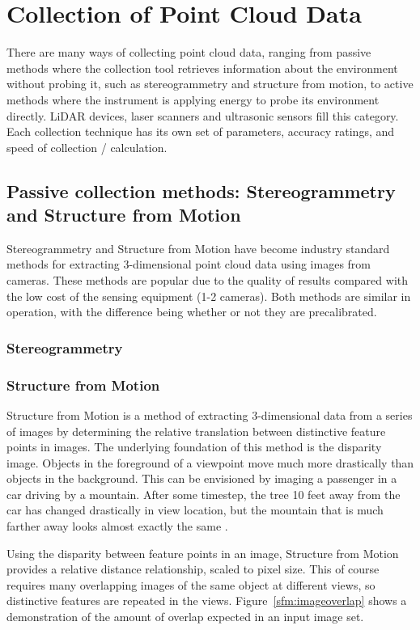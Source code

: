 \documentclass[12pt]{drexelthesis}
\let\Oldsection\section
\renewcommand{\section}{\FloatBarrier\Oldsection}
\let\Oldsubsection\subsection
\renewcommand{\subsection}{\FloatBarrier\Oldsubsection}
\let\Oldsubsubsection\subsubsection
\renewcommand{\subsubsection}{\FloatBarrier\Oldsubsubsection}
\begin{document}
\section{Collection of Point Cloud Data}
\label{sec:PCcollection}
There are many ways of collecting point cloud data, ranging from passive methods where the collection tool retrieves information about the environment without probing it, such as stereogrammetry and structure from motion, to active methods where the instrument is applying energy to probe its environment directly. LiDAR devices, laser scanners and ultrasonic sensors fill this category. Each collection technique has its own set of parameters, accuracy ratings, and speed of collection / calculation.

\subsection{Passive collection methods: Stereogrammetry and Structure from Motion}
\label{subsec:passive}
Stereogrammetry and Structure from Motion have become industry standard methods for extracting 3-dimensional point cloud data using images from cameras. These methods are popular due to the quality of results compared with the low cost of the sensing equipment (1-2 cameras). Both methods are similar in operation, with the difference being whether or not they are precalibrated.


\subsubsection{Stereogrammetry}
\subsubsection{Structure from Motion}

Structure from Motion is a method of extracting 3-dimensional data from a series of images by determining the relative translation between distinctive feature points in images. The underlying foundation of this method is the disparity image. Objects in the foreground of a viewpoint move much more drastically than objects in the background. This can be envisioned by imaging a passenger in a car driving by a mountain. After some timestep, the tree 10 feet away from the car has changed drastically in view location, but the mountain that is much farther away looks almost exactly the same \cite{RN20}.

Using the disparity between feature points in an image, Structure from Motion provides a relative distance relationship, scaled to pixel size. This of course requires many overlapping images of the same object at different views, so distinctive features are repeated in the views. Figure~\ref{sfm:imageoverlap} shows a demonstration of the amount of overlap expected in an input image set.
\end{document}
